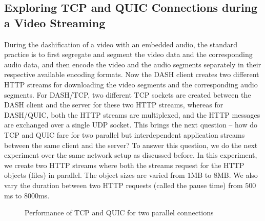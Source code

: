 \subsection{Exploring TCP and QUIC Connections during a Video Streaming}
During the dashification of a video with an embedded audio, the standard practice is to first segregate and segment the video data and the corresponding audio data, and then encode the video and the audio segments separately in their respective available encoding formats.
Now the DASH client creates two different HTTP streams for downloading the video segments and the corresponding audio segments. For DASH/TCP, two different TCP sockets are created between the DASH client and the server for these two HTTP streams, whereas for DASH/QUIC, both the HTTP streams are multiplexed, and the HTTP messages are exchanged over a single UDP socket.
This brings the next question -- how do TCP and QUIC fare for two parallel but interdependent application streams between the same client and the server?  To answer this question, we do the next experiment over the same network setup as discussed before. In this experiment, we create two HTTP streams where both the streams request for the HTTP objects (files) in parallel. The object sizes are varied from $1$MB to $8$MB.
We also vary the duration between two HTTP requests (called the pause time) from $500$ms to $8000$ms. 

\begin{figure}[!ht]
	\captionsetup[subfigure]{}
	\begin{center}
	\end{center}
	\caption{\label{fig:proofUhoodM}Performance of TCP and QUIC for two parallel connections}
\end{figure}


